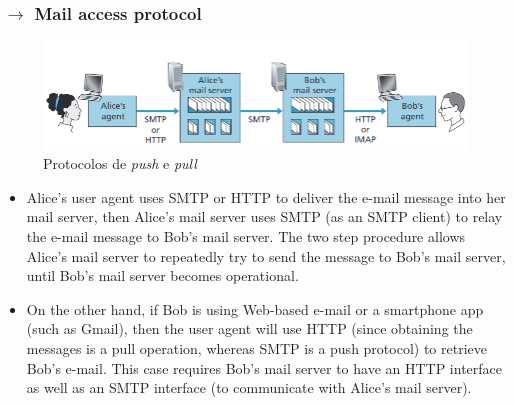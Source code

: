 \subsubsection[2.3.3 Mail access protocol]{$\pmb{\rightarrow}$ Mail access protocol}

\begin{figure}[H]
    \centering
    \includegraphics[width = 1\linewidth]{img/2/email-server.png}
    \caption{Protocolos de \textit{push} e \textit{pull}}
    \label{fig:email-server}
\end{figure}

\begin{itemize}
    \item Alice’s user agent uses SMTP or HTTP to deliver the e-mail
message into her mail server, then Alice’s mail server uses SMTP (as an SMTP client) to relay the e-mail message to Bob’s mail server. The two step procedure allows Alice’s mail server to repeatedly try to send the message to Bob’s mail server, until Bob’s mail server becomes operational.

    \item On the other hand, if Bob is using Web-based e-mail or a smartphone app (such as Gmail), then the user agent will use HTTP (since obtaining the messages is a pull operation, whereas SMTP is a push protocol) to retrieve Bob’s e-mail. This case requires Bob’s mail server to have an HTTP interface as well as an SMTP interface (to communicate with Alice’s mail server).
\end{itemize}

